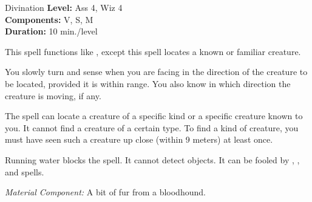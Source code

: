 {Divination}
{
	\textbf{Level:}
	Ass 4, Wiz 4\\
	\textbf{Components:}
	V, S, M\\
	\textbf{Duration:}
	10 min./level\\
}
{
	This spell functions like , except this spell locates a known or familiar creature.

	You slowly turn and sense when you are facing in the direction of the creature to be located, provided it is within range. You also know in which direction the creature is moving, if any.

	The spell can locate a creature of a specific kind or a specific creature known to you. It cannot find a creature of a certain type. To find a kind of creature, you must have seen such a creature up close (within 9 meters) at least once.

	Running water blocks the spell. It cannot detect objects. It can be fooled by , , and  spells.

	\textit{Material Component:}
	A bit of fur from a bloodhound.

}
